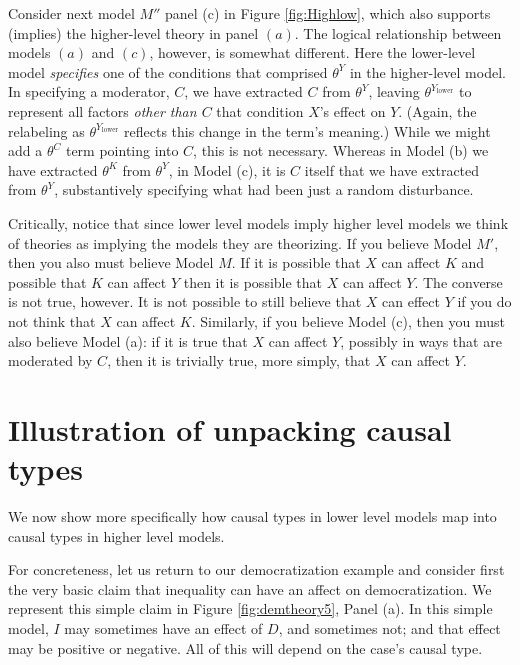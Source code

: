 \documentclass[
  12pt,
]{book}
\begin{document}
Consider next model \(M''\) panel (c) in Figure \ref{fig:Highlow}, which also supports (implies) the higher-level theory in panel \((a)\). The logical relationship between models \((a)\) and \((c)\), however, is somewhat different. Here the lower-level model \emph{specifies} one of the conditions that comprised \(\theta^Y\) in the higher-level model. In specifying a moderator, \(C\), we have extracted \(C\) from \(\theta^Y\), leaving \(\theta^{Y_\text{lower}}\) to represent all factors \emph{other than \(C\)} that condition \(X\)'s effect on \(Y\). (Again, the relabeling as \(\theta^{Y_\text{lower}}\) reflects this change in the term's meaning.) While we might add a \(\theta^C\) term pointing into \(C\), this is not necessary. Whereas in Model (b) we have extracted \(\theta^K\) from \(\theta^Y\), in Model (c), it is \(C\) itself that we have extracted from \(\theta^Y\), substantively specifying what had been just a random disturbance.

Critically, notice that since lower level models imply higher level models we think of theories as implying the models they are theorizing. If you believe Model \(M'\), then you also must believe Model \(M\). If it is possible that \(X\) can affect \(K\) and possible that \(K\) can affect \(Y\) then it is possible that \(X\) can affect \(Y\). The converse is not true, however. It is not possible to still believe that \(X\) can effect \(Y\) if you do not think that \(X\) can affect \(K\). Similarly, if you believe Model (c), then you must also believe Model (a): if it is true that \(X\) can affect \(Y\), possibly in ways that are moderated by \(C\), then it is trivially true, more simply, that \(X\) can affect \(Y\).

\hypertarget{illustration-of-unpacking-causal-types}{%
\section{Illustration of unpacking causal types}\label{illustration-of-unpacking-causal-types}}

We now show more specifically how causal types in lower level models map into causal types in higher level models.

For concreteness, let us return to our democratization example and consider first the very basic claim that inequality can have an affect on democratization. We represent this simple claim in Figure \ref{fig:demtheory5}, Panel (a). In this simple model, \(I\) may sometimes have an effect of \(D\), and sometimes not; and that effect may be positive or negative. All of this will depend on the case's causal type.
\end{document}
